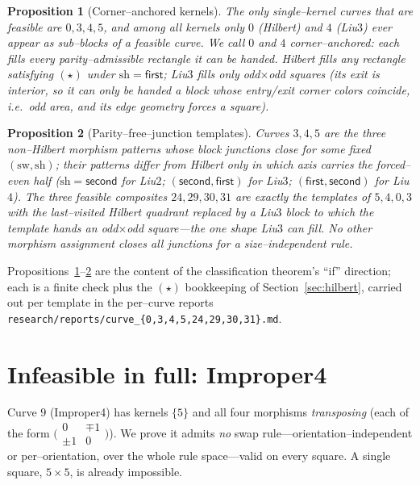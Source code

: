 \documentclass[11pt]{article}
\newtheorem{proposition}{Proposition}
\theoremstyle{definition}
\begin{document}
\begin{proposition}[Corner--anchored kernels]\label{prop:kernels}
The only single--kernel curves that are feasible are $0,3,4,5$, and among all kernels only
$0$ (Hilbert) and $4$ (Liu$3$) ever appear \emph{as sub--blocks} of a feasible curve. We
call $0$ and $4$ \emph{corner--anchored}: each fills every parity--admissible rectangle it
can be handed. Hilbert fills any rectangle satisfying $(\star)$ under $\mathrm{sh}=\textsf{first}$;
Liu$3$ fills only \emph{odd$\times$odd squares} (its exit is interior, so it can only be
handed a block whose entry/exit corner colors coincide, i.e.\ odd area, and its edge
geometry forces a square).
\end{proposition}

\begin{proposition}[Parity--free--junction templates]\label{prop:templates}
Curves $3,4,5$ are the three non--Hilbert morphism patterns whose block junctions close for
some fixed $(\mathrm{sw},\mathrm{sh})$; their patterns differ from Hilbert only in which
axis carries the forced--even half ($\mathrm{sh}=\textsf{second}$ for Liu$2$;
$(\textsf{second},\textsf{first})$ for Liu$3$; $(\textsf{first},\textsf{second})$ for
Liu$4$). The three feasible composites $24,29,30,31$ are exactly the templates of
$5,4,0,3$ with the last--visited Hilbert quadrant replaced by a Liu$3$ block to which the
template hands an odd$\times$odd square---the one shape Liu$3$ can fill. No other morphism
assignment closes all junctions for a size--independent rule.
\end{proposition}

Propositions~\ref{prop:kernels}--\ref{prop:templates} are the content of the classification
theorem's ``if'' direction; each is a finite check plus the $(\star)$ bookkeeping of
Section~\ref{sec:hilbert}, carried out per template in the per--curve reports
\texttt{research/reports/curve\_\{0,3,4,5,24,29,30,31\}.md}.

\section{Infeasible in full: Improper4}\label{sec:improper4}

Curve $9$ (Improper4) has kernels $\{5\}$ and all four morphisms \emph{transposing}
(each of the form $\big(\begin{smallmatrix}0&\mp1\\ \pm1&0\end{smallmatrix}\big)$). We prove
it admits \emph{no} swap rule---orientation--independent or per--orientation, over the whole
rule space---valid on every square. A single square, $5\times5$, is already impossible.
\end{document}
